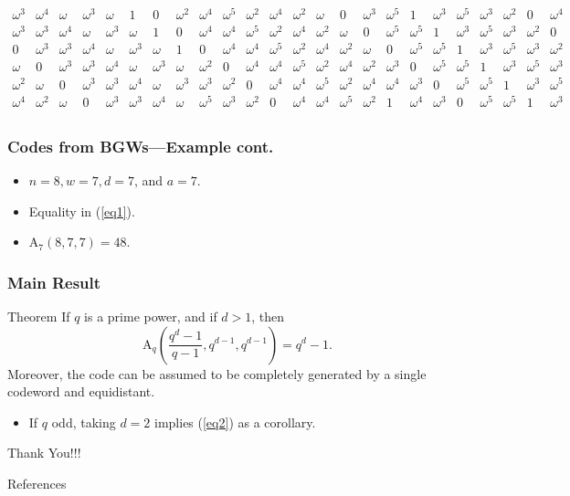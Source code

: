 \documentclass{beamer}
\newcommand{\M}{\mathrm{A}}
\begin{document}
\begin{frame}
\begin{scriptsize}
\[\begin{array}{llllllll|llllllll|llllllll}
\omega^3 & \omega^4 & \omega & \omega^3 & \omega & 1 & 0 & \omega^2 & \omega^4 & \omega^5 & \omega^2 & \omega^4 & \omega^2 & \omega & 0 & \omega^3 & \omega^5 & 1 & \omega^3 & \omega^5 & \omega^3 & \omega^2 & 0 & \omega^4 \\
\omega^3 & \omega^3 & \omega^4 & \omega & \omega^3 & \omega & 1 & 0 & \omega^4 & \omega^4 & \omega^5 & \omega^2 & \omega^4 & \omega^2 & \omega & 0 & \omega^5 & \omega^5 & 1 & \omega^3 & \omega^5 & \omega^3 & \omega^2 & 0 \\
0 & \omega^3 & \omega^3 & \omega^4 & \omega & \omega^3 & \omega & 1 & 0 & \omega^4 & \omega^4 & \omega^5 & \omega^2 & \omega^4 & \omega^2 & \omega & 0 & \omega^5 & \omega^5 & 1 & \omega^3 & \omega^5 & \omega^3 & \omega^2 \\
\omega & 0 & \omega^3 & \omega^3 & \omega^4 & \omega & \omega^3 & \omega & \omega^2 & 0 & \omega^4 & \omega^4 & \omega^5 & \omega^2 & \omega^4 & \omega^2 & \omega^3 & 0 & \omega^5 & \omega^5 & 1 & \omega^3 & \omega^5 & \omega^3 \\
\omega^2 & \omega & 0 & \omega^3 & \omega^3 & \omega^4 & \omega & \omega^3 & \omega^3 & \omega^2 & 0 & \omega^4 & \omega^4 & \omega^5 & \omega^2 & \omega^4 & \omega^4 & \omega^3 & 0 & \omega^5 & \omega^5 & 1 & \omega^3 & \omega^5 \\
\omega^4 & \omega^2 & \omega & 0 & \omega^3 & \omega^3 & \omega^4 & \omega & \omega^5 & \omega^3 & \omega^2 & 0 & \omega^4 & \omega^4 & \omega^5 & \omega^2 & 1 & \omega^4 & \omega^3 & 0 & \omega^5 & \omega^5 & 1 & \omega^3 \\
   \end{array}
  \]
  \end{scriptsize}
 \end{frame}
 
 \begin{frame}
  \frametitle{Codes from BGWs---Example cont.}
  \begin{itemize}
   \item $n = 8, w = 7, d = 7$, and $a=7$.
   \item Equality in (\ref{eq1}).
   \item $\M_7(8,7,7) = 48$.
  \end{itemize}
 \end{frame}

 \begin{frame}
  \frametitle{Main Result}
  \begin{block}{Theorem}
   If $q$ is a prime power, and if $d > 1$, then
   $$
   \M_q\left(\frac{q^d-1}{q-1},q^{d-1}, q^{d-1}\right) = q^d-1.
   $$
   Moreover, the code can be assumed to be completely generated by a single codeword and equidistant.
  \end{block}
  \begin{itemize}
   \item If $q$ odd, taking $d=2$ implies (\ref{eq2}) as a corollary.
  \end{itemize}
 \end{frame}
 
 \begin{frame}
  \centering\huge Thank You!!!
 \end{frame}
 
 \begin{frame}{References}
  
  
 \end{frame}
\end{document}
